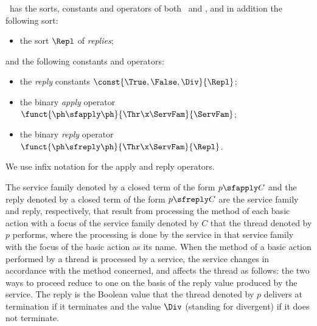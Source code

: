 \documentclass[fleqn]{llncs}
\begin{document}
\TAbt\ has the sorts, constants and operators of both \BTAbt\ and \SFA,
and in addition the following sort:
\begin{itemize}
\item
the sort $\Repl$ of \emph{replies};
\end{itemize}
and the following constants and operators:
\begin{itemize}
\item
the \emph{reply} constants $\const{\True,\False,\Div}{\Repl}$;
\item
the binary \emph{apply} operator
$\funct{\ph \sfapply \ph}{\Thr \x \ServFam}{\ServFam}$;
\item
the binary \emph{reply} operator
$\funct{\ph \sfreply \ph}{\Thr \x \ServFam}{\Repl}$.
\end{itemize}
We use infix notation for the apply and reply operators.

The service family denoted by a closed term of the form $p \sfapply C$
and the reply denoted by a closed term of the form $p \sfreply C$ are
the service family and reply, respectively, that result from processing
the method of each basic action with a focus of the service family
denoted by $C$ that the thread denoted by $p$ performs, where the
processing is done by the service in that service family with the focus
of the basic action as its name.
When the method of a basic action performed by a thread is processed by
a service, the service changes in accordance with the method concerned,
and affects the thread as follows: the two ways to proceed reduce to one
on the basis of the reply value produced by the service.
The reply is the Boolean value that the thread denoted by $p$ delivers
at termination if it terminates and the value $\Div$ (standing for
divergent) if it does not terminate.
\end{document}
